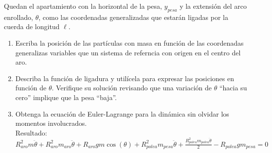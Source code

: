 \documentclass[11pt, spanish, a4paper, twoside]{article}
\begin{document}
\begin{enumerate}
\begin{minipage}[t][6cm]{0.57\textwidth}
		Quedan el apartamiento con la horizontal de la pesa, \(y_{pesa}\) y la extensión del arco enrollado, \(\theta\), como las coordenadas generalizadas que estarán ligadas por la cuerda de longitud \(\ell\).
	\end{minipage}
	\begin{minipage}[c][2.5cm][t]{0.2\textwidth}
		
	\end{minipage}
	\begin{enumerate}
		\item Escriba la posición de las partículas con masa en función de las coordenadas generalizas variables que  un sistema de referncia con origen en el centro del aro.
		\item Describa la función de ligadura y utilícela para expresar las posiciones en función de \(\theta\).
		Verifique su solución revisando que una variación de \(\theta\) ``hacia su cero'' implique que la pesa ``baja''. 
		\item Obtenga la ecuación de Euler-Lagrange para la dinámica sin olvidar los momentos involucrados.\\
		Resultado:
		\(
		R_{aro}^{2} m \ddot{\theta} + R_{aro}^{2} m_{aro} \ddot{\theta} + R_{aro} g m \cos{\left(\theta \right)} + R_{polea}^{2} m_{pesa} \ddot{\theta} + \frac{R_{polea}^{2} m_{polea} \ddot{\theta}}{2} - R_{polea} g m_{pesa} = 0
		\)
	\end{enumerate}



\end{enumerate}
\end{document}
